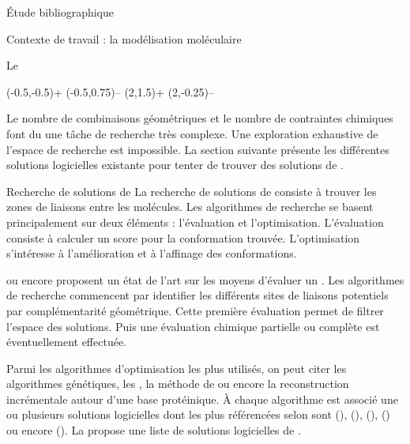 \documentclass[myfrancais,ngerman,english,french]{mythesis}
\begin{document}
\begin{mychapter}{Étude bibliographique}
\begin{mysection}{Contexte de travail : la modélisation moléculaire}
\begin{mysubsection}{Le }
\begin{myfigure}
\begin{mysubfigure}
\begin{myps}
							\mysign(-0.5,-0.5){+}
							\mysign(-0.5,0.75){--}
							\mysign(2,1.5){+}
							\mysign(2,-0.25){--}
						\end{myps}
					\end{mysubfigure}
				\end{myfigure}

				Le nombre de combinaisons géométriques et le nombre de contraintes chimiques font du  une tâche de recherche très complexe.
				Une exploration exhaustive de l'espace de recherche est impossible.
				La section suivante présente les différentes solutions logicielles existante pour tenter de trouver des solutions de .
			\end{mysubsection}
			\begin{mysubsection}{Recherche de solutions de }
				La recherche de solutions de  consiste à trouver les zones de liaisons entre les molécules.
				Les algorithmes de recherche se basent principalement sur deux éléments : l'évaluation et l'optimisation.
				L'évaluation consiste à calculer un score pour la conformation trouvée.
				L'optimisation s'intéresse à l'amélioration et à l'affinage des conformations.

				 ou encore  proposent un état de l'art sur les moyens d'évaluer un .
				Les algorithmes de recherche commencent par identifier les différents sites de liaisons potentiels par complémentarité géométrique.
				Cette première évaluation permet de filtrer l'espace des solutions.
				Puis une évaluation chimique partielle ou complète est éventuellement effectuée.

				Parmi les algorithmes d'optimisation les plus utilisés, on peut citer les algorithmes génétiques, les , la méthode de  ou encore la reconstruction incrémentale autour d'une base protéinique.
				À chaque algorithme est associé une ou plusieurs solutions logicielles dont les plus référencées selon  sont \myAutoDock (), \myGOLD (), \myFlexX (), \myDOCK () ou encore \myICMDocking ().
				La  propose une liste de solutions logicielles de .


\end{mysubsection}
\end{mysection}
\end{mychapter}
\end{document}
